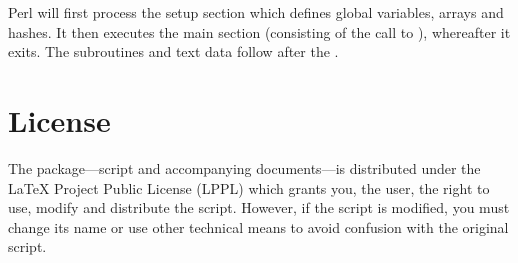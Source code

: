 \documentclass{article}
\begin{document}
Perl will first process the setup section which defines global variables, arrays and hashes. It then executes the main section (consisting of the call to ), whereafter it exits. The subroutines and text data follow after the .


\section{License}

The \TeXcount{} package---script and accompanying documents---is distributed
under the \LaTeX{} Project Public License (LPPL)
which grants you, the user, the right to use, modify and distribute
the script. However, if the script is modified, you must change its
name or use other technical means to avoid confusion with the original script.
\end{document}
